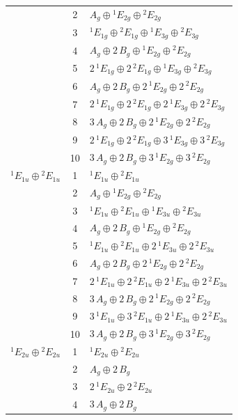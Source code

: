 \documentclass[11pt]{article}
\begin{document}
\begin{longtable}{l c p{}}
 & 2 & $A_{g}\oplus {}^{1}E_{2g}\oplus {}^{2}E_{2g}$\\
 & 3 & ${}^{1}E_{1g}\oplus {}^{2}E_{1g}\oplus {}^{1}E_{3g}\oplus {}^{2}E_{3g}$\\
 & 4 & $A_{g}\oplus 2\,B_{g}\oplus {}^{1}E_{2g}\oplus {}^{2}E_{2g}$\\
 & 5 & $2\,{}^{1}E_{1g}\oplus 2\,{}^{2}E_{1g}\oplus {}^{1}E_{3g}\oplus {}^{2}E_{3g}$\\
 & 6 & $A_{g}\oplus 2\,B_{g}\oplus 2\,{}^{1}E_{2g}\oplus 2\,{}^{2}E_{2g}$\\
 & 7 & $2\,{}^{1}E_{1g}\oplus 2\,{}^{2}E_{1g}\oplus 2\,{}^{1}E_{3g}\oplus 2\,{}^{2}E_{3g}$\\
 & 8 & $3\,A_{g}\oplus 2\,B_{g}\oplus 2\,{}^{1}E_{2g}\oplus 2\,{}^{2}E_{2g}$\\
 & 9 & $2\,{}^{1}E_{1g}\oplus 2\,{}^{2}E_{1g}\oplus 3\,{}^{1}E_{3g}\oplus 3\,{}^{2}E_{3g}$\\
 & 10 & $3\,A_{g}\oplus 2\,B_{g}\oplus 3\,{}^{1}E_{2g}\oplus 3\,{}^{2}E_{2g}$\\
\hline
${}^{1}E_{1u}\oplus {}^{2}E_{1u}$ & 1 & ${}^{1}E_{1u}\oplus {}^{2}E_{1u}$\\
 & 2 & $A_{g}\oplus {}^{1}E_{2g}\oplus {}^{2}E_{2g}$\\
 & 3 & ${}^{1}E_{1u}\oplus {}^{2}E_{1u}\oplus {}^{1}E_{3u}\oplus {}^{2}E_{3u}$\\
 & 4 & $A_{g}\oplus 2\,B_{g}\oplus {}^{1}E_{2g}\oplus {}^{2}E_{2g}$\\
 & 5 & ${}^{1}E_{1u}\oplus {}^{2}E_{1u}\oplus 2\,{}^{1}E_{3u}\oplus 2\,{}^{2}E_{3u}$\\
 & 6 & $A_{g}\oplus 2\,B_{g}\oplus 2\,{}^{1}E_{2g}\oplus 2\,{}^{2}E_{2g}$\\
 & 7 & $2\,{}^{1}E_{1u}\oplus 2\,{}^{2}E_{1u}\oplus 2\,{}^{1}E_{3u}\oplus 2\,{}^{2}E_{3u}$\\
 & 8 & $3\,A_{g}\oplus 2\,B_{g}\oplus 2\,{}^{1}E_{2g}\oplus 2\,{}^{2}E_{2g}$\\
 & 9 & $3\,{}^{1}E_{1u}\oplus 3\,{}^{2}E_{1u}\oplus 2\,{}^{1}E_{3u}\oplus 2\,{}^{2}E_{3u}$\\
 & 10 & $3\,A_{g}\oplus 2\,B_{g}\oplus 3\,{}^{1}E_{2g}\oplus 3\,{}^{2}E_{2g}$\\
\hline
${}^{1}E_{2u}\oplus {}^{2}E_{2u}$ & 1 & ${}^{1}E_{2u}\oplus {}^{2}E_{2u}$\\
 & 2 & $A_{g}\oplus 2\,B_{g}$\\
 & 3 & $2\,{}^{1}E_{2u}\oplus 2\,{}^{2}E_{2u}$\\
 & 4 & $3\,A_{g}\oplus 2\,B_{g}$\\

\end{longtable}
\end{document}
